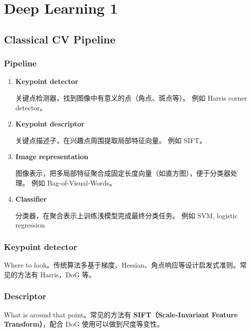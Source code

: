 \section{Deep Learning 1}\label{deep-learning-1}

\subsection{Classical CV Pipeline}\label{classical-cv-pipeline}

\subsubsection{Pipeline}\label{pipeline}

\begin{enumerate}
  \def\labelenumi{\arabic{enumi}.}
  \item
        \textbf{Keypoint detector}

        关键点检测器，找到图像中有意义的点（角点、斑点等）。 例如 Harris
        corner detector。
  \item
        \textbf{Keypoint descriptor}

        关键点描述子，在兴趣点周围提取局部特征向量。 例如 SIFT。
  \item
        \textbf{Image representation}

        图像表示，把多局部特征聚合成固定长度向量（如直方图），便于分类器处理。
        例如 Bag-of-Visual-Words。
  \item
        \textbf{Classifier}

        分类器，在聚合表示上训练浅模型完成最终分类任务。 例如 SVM, logistic
        regression
\end{enumerate}

\subsubsection{Keypoint detector}\label{keypoint-detector}

Where to
look。传统算法多基于梯度、Hessian、角点响应等设计启发式准则。常见的方法有
Harris，DoG 等。

\subsubsection{Descriptor}\label{descriptor}

What is around that point。常见的方法有 \textbf{SIFT（Scale-Invariant
  Feature Transform）}，配合 DoG 使用可以做到尺度等变性。

